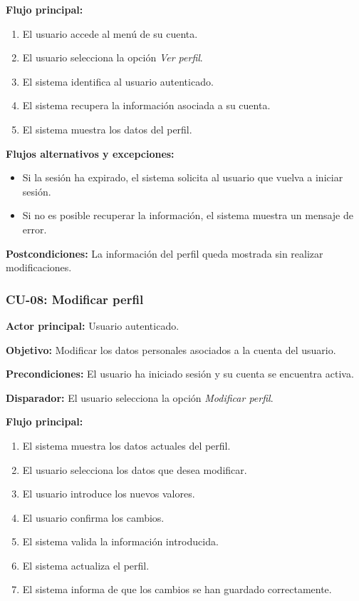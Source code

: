 \noindent \textbf{Flujo principal:}
\begin{enumerate}
    \item El usuario accede al menú de su cuenta.
    \item El usuario selecciona la opción \textit{Ver perfil}.
    \item El sistema identifica al usuario autenticado.
    \item El sistema recupera la información asociada a su cuenta.
    \item El sistema muestra los datos del perfil.
\end{enumerate}

\noindent \textbf{Flujos alternativos y excepciones:}
\begin{itemize}
    \item Si la sesión ha expirado, el sistema solicita al usuario que vuelva a iniciar sesión.
    \item Si no es posible recuperar la información, el sistema muestra un mensaje de error.
\end{itemize}

\noindent \textbf{Postcondiciones:} La información del perfil queda mostrada sin realizar modificaciones.

\subsubsection{CU-08: Modificar perfil}

\noindent \textbf{Actor principal:} Usuario autenticado.

\noindent \textbf{Objetivo:} Modificar los datos personales asociados a la cuenta del usuario.

\noindent \textbf{Precondiciones:} El usuario ha iniciado sesión y su cuenta se encuentra activa.

\noindent \textbf{Disparador:} El usuario selecciona la opción \textit{Modificar perfil}.

\noindent \textbf{Flujo principal:}
\begin{enumerate}
    \item El sistema muestra los datos actuales del perfil.
    \item El usuario selecciona los datos que desea modificar.
    \item El usuario introduce los nuevos valores.
    \item El usuario confirma los cambios.
    \item El sistema valida la información introducida.
    \item El sistema actualiza el perfil.
    \item El sistema informa de que los cambios se han guardado correctamente.
\end{enumerate}


